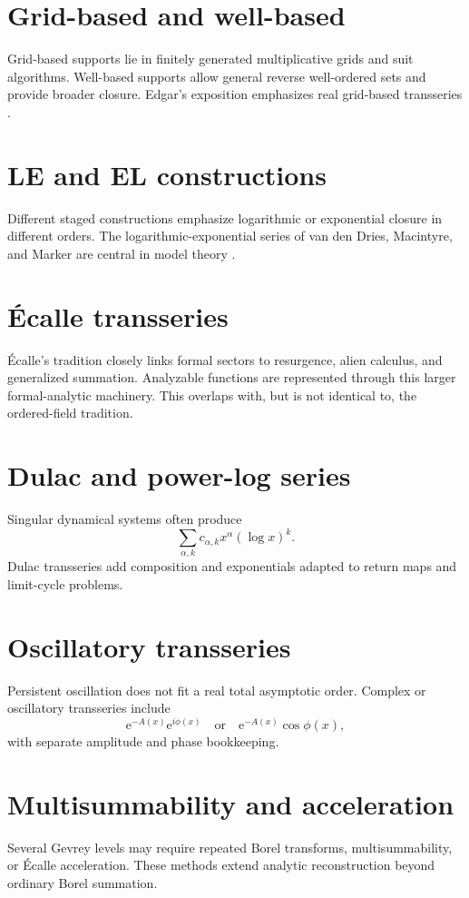 \documentclass[11pt,oneside,openany]{book}
\newcommand{\e}{\mathrm{e}}
\theoremstyle{plain}
\theoremstyle{definition}
\theoremstyle{remark}
\begin{document}
\section{Grid-based and well-based}
Grid-based supports lie in finitely generated multiplicative grids and suit algorithms. Well-based supports allow general reverse well-ordered sets and provide broader closure. Edgar's exposition emphasizes real grid-based transseries \cite{Edgar2010}.

\section{LE and EL constructions}
Different staged constructions emphasize logarithmic or exponential closure in different orders. The logarithmic-exponential series of van den Dries, Macintyre, and Marker are central in model theory \cite{DMM2001}.

\section{Écalle transseries}
Écalle's tradition closely links formal sectors to resurgence, alien calculus, and generalized summation. Analyzable functions are represented through this larger formal-analytic machinery. This overlaps with, but is not identical to, the ordered-field tradition.

\section{Dulac and power-log series}
Singular dynamical systems often produce
\[
  \sum_{\alpha,k}c_{\alpha,k}x^\alpha(\log x)^k.
\]
Dulac transseries add composition and exponentials adapted to return maps and limit-cycle problems.

\section{Oscillatory transseries}
Persistent oscillation does not fit a real total asymptotic order. Complex or oscillatory transseries include
\[
  \e^{-A(x)}\e^{i\phi(x)}
  \quad\text{or}\quad
  \e^{-A(x)}\cos\phi(x),
\]
with separate amplitude and phase bookkeeping.

\section{Multisummability and acceleration}
Several Gevrey levels may require repeated Borel transforms, multisummability, or Écalle acceleration. These methods extend analytic reconstruction beyond ordinary Borel summation.
\end{document}
